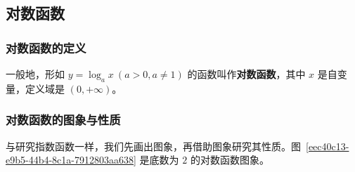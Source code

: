 \documentclass[a4paper,openany]{ctexbook}
\begin{document}
\subsection{对数函数}

\subsubsection{对数函数的定义}

一般地，形如 \(y=\log_a x\ (a>0,a\ne 1)\) 的函数叫作\textbf{对数函数}，其中 \(x\) 是自变量，定义域是 \((0,+\infty )\)。

\subsubsection{对数函数的图象与性质}

与研究指数函数一样，我们先画出图象，再借助图象研究其性质。图~\ref{eec40c13-e9b5-44b4-8c1a-7912803aa638} 是底数为 \(2\) 的对数函数图象。
\end{document}
